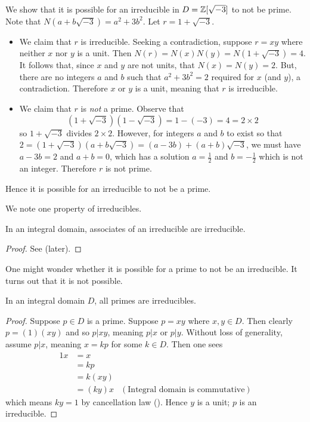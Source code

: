 \begin{example}
    We show that it is possible for an irreducible in $D = \mathbb{Z}[\sqrt{-3}]$ to not be prime. Note that $N(a+b\sqrt{-3}) = a^2 + 3b^2$. Let $r = 1 + \sqrt{-3}$.
    \begin{itemize}
        \item We claim that $r$ is irreducible. Seeking a contradiction, suppose $r = xy$ where neither $x$ nor $y$ is a unit. Then $N(r) = N(x)N(y) = N(1+\sqrt{-3}) = 4$. It follows that, since $x$ and $y$ are not units, that $N(x) = N(y) = 2$. But, there are no integers $a$ and $b$ such that $a^2 + 3b^2 = 2$ required for $x$ (and $y$), a contradiction. Therefore $x$ or $y$ is a unit, meaning that $r$ is irreducible.

        \item We claim that $r$ is \textit{not} a prime. Observe that
        \[
            (1+\sqrt{-3})(1-\sqrt{-3}) = 1-(-3) = 4 = 2 \times 2
        \]
        so $1 + \sqrt{-3}$ divides $2 \times 2$. However, for integers $a$ and $b$ to exist so that $2 = (1+\sqrt{-3})(a+b\sqrt{-3}) = (a-3b) + (a+b)\sqrt{-3}$, we must have $a - 3b = 2$ and $a + b = 0$, which has a solution $a = \frac12$ and $b = -\frac12$ which is not an integer. Therefore $r$ is not prime.
    \end{itemize}
    Hence it is possible for an irreducible to not be a prime.
\end{example}

\newpage

We note one property of irreducibles.
\begin{proposition}\label{prop-associates-of-irreducible-is-irreducible}
    In an integral domain, associates of an irreducible are irreducible.
\end{proposition}
\begin{proof}
    See  (later).
\end{proof}

One might wonder whether it is possible for a prime to not be an irreducible. It turns out that it is not possible.
\begin{theorem}\label{thrm-in-integral-domain-primes-are-irreducibles}
    In an integral domain $D$, all primes are irreducibles.
\end{theorem}
\begin{proof}
    Suppose $p \in D$ is a prime. Suppose $p = xy$ where $x, y\in D$. Then clearly $p = (1)(xy)$ and so $p \vert xy$, meaning $p \vert x$ or $p \vert y$. Without loss of generality, assume $p \vert x$, meaning $x = kp$ for some $k \in D$. Then one sees
    \begin{align*}
        1x &= x\\
        &= kp\\
        &= k(xy)\\
        &= (ky)x & (\text{Integral domain is commutative})
    \end{align*}
    which means $ky = 1$ by cancellation law (). Hence $y$ is a unit; $p$ is an irreducible.
\end{proof}

